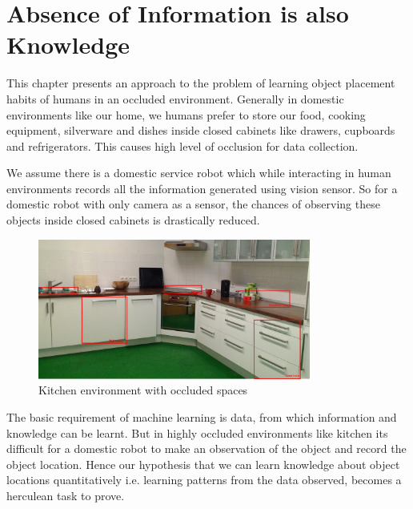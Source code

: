 \chapter{Absence of Information is also Knowledge}

This chapter presents an approach to the problem of learning object placement habits of humans in an occluded environment. Generally in domestic environments like our home, we humans prefer to store our food, cooking equipment, silverware and dishes inside closed cabinets like drawers, cupboards and refrigerators. This causes high level of occlusion for data collection.

We assume there is a domestic service robot which while interacting in human environments records all the information generated using vision sensor.
So for a domestic robot with only camera as a sensor, the chances of observing  these objects inside closed cabinets is drastically reduced.

\begin{figure}[htp]
\centering
\includegraphics[width=0.8\textwidth]{images/kitchen_crop_ano.png}
\caption{Kitchen environment with occluded spaces}
\label{fig:kitchen occluded}
\end{figure}

The basic requirement of machine learning is data, from which information and knowledge can be learnt. But in highly occluded environments like kitchen its difficult for a domestic robot to make an observation of the object and record the object location.  Hence our hypothesis that we can learn knowledge about object locations quantitatively i.e. learning patterns from the data observed, becomes a herculean task to prove.

